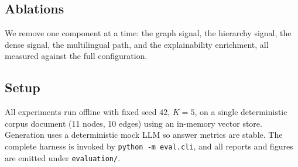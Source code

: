 \subsection{Ablations}

We remove one component at a time: the graph signal, the hierarchy signal, the
dense signal, the multilingual path, and the explainability enrichment, all
measured against the full configuration.

\subsection{Setup}

All experiments run offline with fixed seed $42$, $K=5$, on a single
deterministic corpus document (11 nodes, 10 edges) using an in-memory vector
store. Generation uses a deterministic mock LLM so answer metrics are stable.
The complete harness is invoked by \texttt{python -m eval.cli}, and all
reports and figures are emitted under \texttt{evaluation/}.
